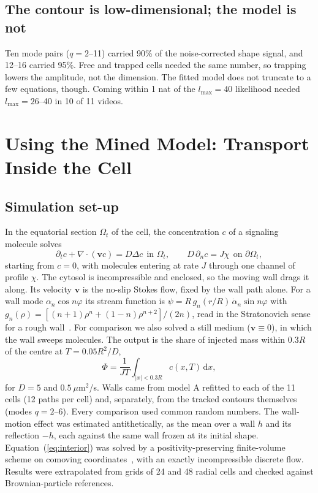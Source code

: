 \documentclass[conference]{IEEEtran}
\newcommand{\dd}{\mathrm{d}}
\begin{document}
\subsection{The contour is low-dimensional; the model is not}
Ten mode pairs ($q = 2$--11) carried 90\% of the noise-corrected shape signal, and 12--16 carried
95\%. Free and trapped cells needed the same number, so trapping lowers the amplitude, not the
dimension. The fitted model does not truncate to a few equations, though. Coming within 1 nat of
the $l_{\max} = 40$ likelihood needed $l_{\max} = 26$--40 in 10 of 11 videos.

\section{Using the Mined Model: Transport Inside the Cell}\label{sec:transport}

\subsection{Simulation set-up}
In the equatorial section $\Omega_t$ of the cell, the concentration $c$ of a signaling molecule
solves
\begin{equation}
\partial_t c + \nabla\cdot(\mathbf v c) = D\Delta c\ \ \text{in }\Omega_t,\qquad
D\,\partial_n c = J\chi\ \ \text{on }\partial\Omega_t,
\label{eq:interior}
\end{equation}
starting from $c = 0$, with molecules entering at rate $J$ through one channel of profile $\chi$.
The cytosol is incompressible and enclosed, so the moving wall drags it along. Its velocity
$\mathbf v$ is the no-slip Stokes flow, fixed by the wall path alone. For a wall mode
$\alpha_n\cos n\varphi$ its stream function is
$\psi = R\,g_n(r/R)\,\dot\alpha_n\sin n\varphi$ with
$g_n(\rho) = [(n+1)\rho^n + (1-n)\rho^{n+2}]/(2n)$, read in the Stratonovich sense for a rough
wall~\cite{kunita1990}. For comparison we also solved a still medium ($\mathbf v \equiv 0$), in
which the wall sweeps molecules. The output is the share of injected mass within $0.3R$ of the
centre at $T = 0.05R^2/D$,
\begin{equation}
\Phi = \frac{1}{JT}\int_{|x|<0.3R} c(x,T)\,\dd x,
\label{eq:phi}
\end{equation}
for $D = 5$ and $0.5~\mu$m$^2$/s. Walls came from model A refitted to each of the 11 cells (12
paths per cell) and, separately, from the tracked contours themselves (modes $q = 2$--6). Every
comparison used common random numbers. The wall-motion effect was estimated antithetically, as the
mean over a wall $h$ and its reflection $-h$, each against the same wall frozen at its initial
shape. Equation~(\ref{eq:interior}) was solved by a positivity-preserving finite-volume scheme on
comoving coordinates~\cite{lepotier2005,yuan2008}, with an exactly incompressible discrete flow.
Results were extrapolated from grids of 24 and 48 radial cells and checked against Brownian-particle
references.
\end{document}

